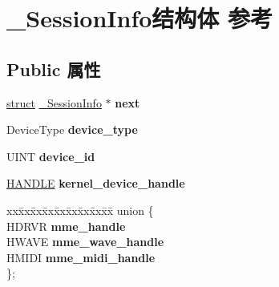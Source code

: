 \hypertarget{struct___session_info}{}\section{\+\_\+\+Session\+Info结构体 参考}
\label{struct___session_info}
\subsection*{Public 属性}
\begin{DoxyCompactItemize}
\item 
\mbox{\label{struct___session_info_ac1be81719e00b6bf033e6e66c60ea5cc}} 
\hyperlink{interfacestruct}{struct} \hyperlink{struct___session_info}{\+\_\+\+Session\+Info} $\ast$ {\bfseries next}
\item 
\mbox{\label{struct___session_info_a71ad883d1278aad71dc0447879795e20}} 
Device\+Type {\bfseries device\+\_\+type}
\item 
\mbox{\label{struct___session_info_af0265946a6032701d4a7c7623844f873}} 
U\+I\+NT {\bfseries device\+\_\+id}
\item 
\mbox{\label{struct___session_info_a9dde785217537089e527f4e75de5020b}} 
\hyperlink{interfacevoid}{H\+A\+N\+D\+LE} {\bfseries kernel\+\_\+device\+\_\+handle}
\item 
\mbox{\label{struct___session_info_acd824869775b4081a8183bc155899334}} 
\begin{tabbing}
xx\=xx\=xx\=xx\=xx\=xx\=xx\=xx\=xx\=\kill
union \{\\
\>HDRVR {\bfseries mme\_handle}\\
\>HWAVE {\bfseries mme\_wave\_handle}\\
\>HMIDI {\bfseries mme\_midi\_handle}\\
\}; \\


\end{tabbing}
\end{DoxyCompactItemize}
